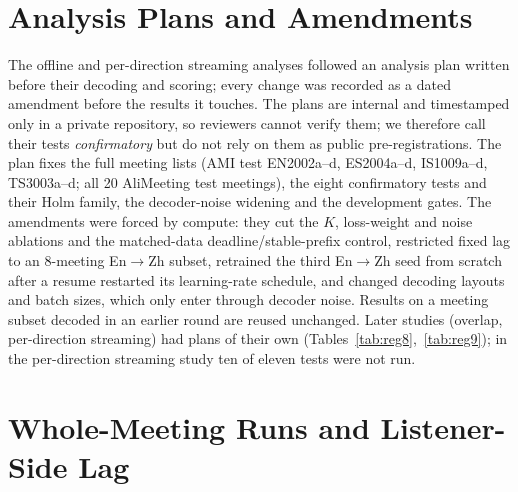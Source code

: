 



\section{Analysis Plans and Amendments}
\label{app:prereg}

The offline and per-direction streaming analyses followed an analysis plan written before their decoding and scoring;
every change was recorded as a dated amendment before the results it touches. The plans are internal and timestamped
only in a private repository, so reviewers cannot verify them; we therefore call their tests \emph{confirmatory} but do
not rely on them as public pre-registrations. The plan fixes the full meeting lists (AMI test EN2002a--d, ES2004a--d,
IS1009a--d, TS3003a--d; all 20 AliMeeting test meetings), the eight confirmatory tests and their Holm family, the
decoder-noise widening and the development gates. The amendments were forced by compute: they cut the $K$, loss-weight
and noise ablations and the matched-data deadline/stable-prefix control, restricted fixed lag to an 8-meeting
En$\rightarrow$Zh subset, retrained the third En$\rightarrow$Zh seed from scratch after a resume restarted its
learning-rate schedule, and changed decoding layouts and batch sizes, which only enter through decoder noise. Results on
a meeting subset decoded in an earlier round are reused unchanged. Later studies (overlap, per-direction streaming) had
plans of their own (Tables~\ref{tab:reg8},~\ref{tab:reg9}); in the per-direction streaming study ten of eleven tests were
not run.

\section{Whole-Meeting Runs and Listener-Side Lag}
\label{app:online}
\label{app:online7}




